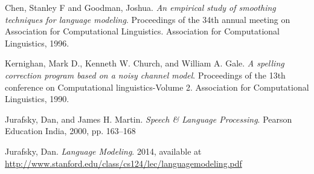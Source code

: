 \documentclass{article}
\begin{document}
\begin{thebibliography}{9}

    Chen, Stanley F and Goodman, Joshua.
    \emph{An empirical study of smoothing techniques for language modeling}.
    Proceedings of the 34th annual meeting on Association for Computational Linguistics. Association for Computational Linguistics, 1996.

    Kernighan, Mark D., Kenneth W. Church, and William A. Gale.
    \emph{A spelling correction program based on a noisy channel model}.
    Proceedings of the 13th conference on Computational linguistics-Volume 2. Association for Computational Linguistics, 1990.

    Jurafsky, Dan, and James H. Martin.
    \emph{Speech \& Language Processing}.
    Pearson Education India, 2000, pp. 163--168

    Jurafsky, Dan.
    \emph{Language Modeling}.
    2014, available at \url{http://www.stanford.edu/class/cs124/lec/languagemodeling.pdf}
\end{thebibliography}
\end{document}
